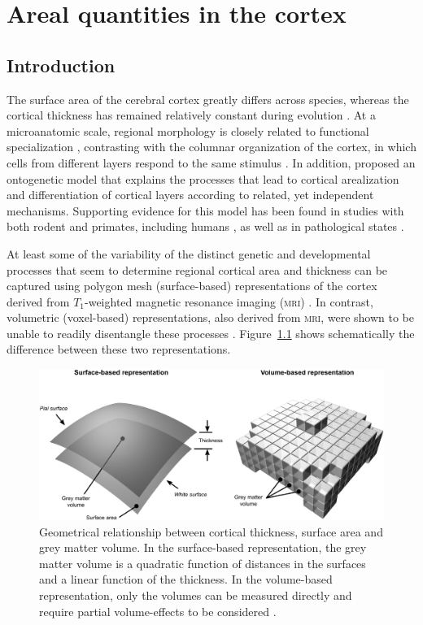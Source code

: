 \chapter{Areal quantities in the cortex}
\label{sec:areal}
\setstretch{\lspac}

\section{Introduction}

The surface area of the cerebral cortex greatly differs across species, whereas the cortical thickness has remained relatively constant during evolution \citep{Mountcastle1998, Fish2008}. At a microanatomic scale, regional morphology is closely related to functional specialization \citep{Roland1998, Zilles2010}, contrasting with the columnar organization of the cortex, in which cells from different layers respond to the same stimulus \citep{EGJones2000, Buxhoeveden2002}. In addition, \citet{Rakic1988} proposed an ontogenetic model that explains the processes that lead to cortical arealization and differentiation of cortical layers according to related, yet independent mechanisms. Supporting evidence for this model has been found in studies with both rodent and primates, including humans \citep{Chenn2002, Rakic2009}, as well as in pathological states \citep{Rimol2010b, Bilguvar2010}.

At least some of the variability of the distinct genetic and developmental processes that seem to determine regional cortical area and thickness can be captured using polygon mesh (surface-based) representations of the cortex derived from $T_1$-weighted magnetic resonance imaging (\textsc{mri}) \citep{Panizzon2009, Winkler2010, SanabriaDiaz2010}. In contrast, volumetric (voxel-based) representations, also derived from \textsc{mri}, were shown to be unable to readily disentangle these processes \citep{Winkler2010}. Figure~\ref{fig:areal:geometry} shows schematically the difference between these two representations.

\begin{figure}[!tp]
\centering
\includegraphics[width=14cm]{images/geometry.jpg}
\caption[Surface- and volume-based representations of the cortex.]{Geometrical relationship between cortical thickness, surface area and grey matter volume. In the surface-based representation, the grey matter volume is a quadratic function of distances in the surfaces and a linear function of the thickness. In the volume-based representation, only the volumes can be measured directly and require partial volume-effects to be considered \citep{Winkler2010}.}
\label{fig:areal:geometry}
\end{figure}

